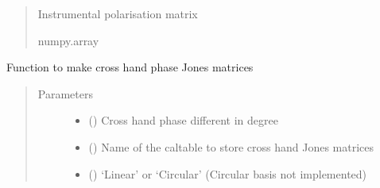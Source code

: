 \documentclass[letterpaper,10pt,english]{sphinxmanual}
\begin{document}
\begin{fulllineitems}
\begin{fulllineitems}
\begin{quote}
\begin{description}
\begin{itemize}
\end{itemize}

\item[{Returns}] \leavevmode
\sphinxAtStartPar
Instrumental polarisation matrix

\item[{Return type}] \leavevmode
\sphinxAtStartPar
numpy.array

\end{description}\end{quote}

\end{fulllineitems}


\begin{fulllineitems}
\label{\detokenize{paircars:paircars.fullpol_selfcal_LTS.PolSelfcal.make_crosshand_phase_caltable}}
\sphinxAtStartPar
Function to make cross hand phase Jones matrices
\begin{quote}\begin{description}
\item[{Parameters}] \leavevmode\begin{itemize}
\item {} 
\sphinxAtStartPar
{} () \textendash{} Cross hand phase different in degree

\item {} 
\sphinxAtStartPar
{} () \textendash{} Name of the caltable to store cross hand Jones matrices

\item {} 
\sphinxAtStartPar
{} () \textendash{} ‘Linear’ or ‘Circular’ (Circular basis not implemented)

\end{itemize}


\end{description}
\end{quote}
\end{fulllineitems}
\end{fulllineitems}
\end{document}
